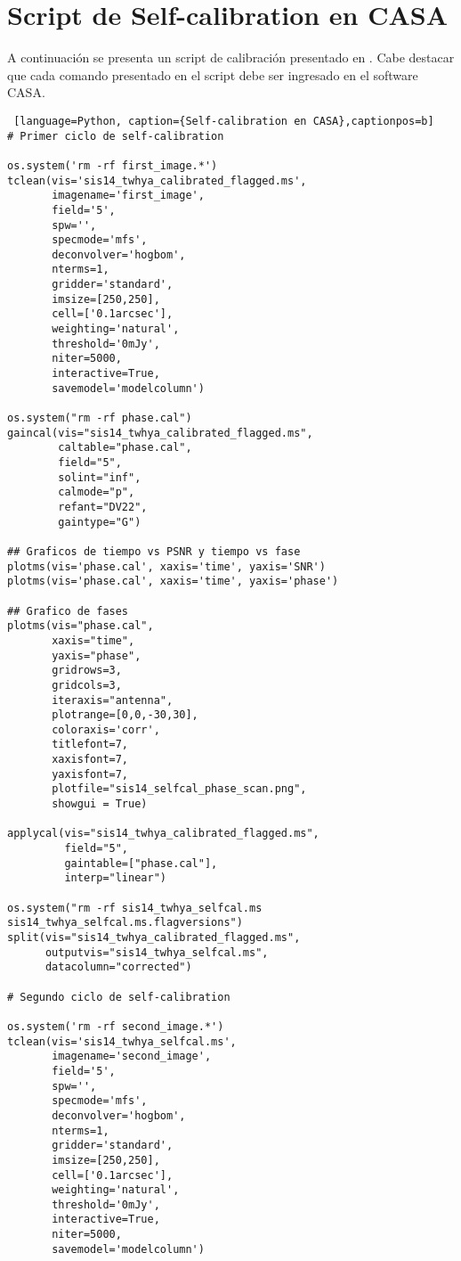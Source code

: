\chapter{Script de Self-calibration en CASA}
\label{finales:anexo2}

A continuación se presenta un script de calibración presentado en \cite{CASA_self_cal}. Cabe destacar que cada comando presentado en el script debe ser ingresado en el software CASA. 

\begin{lstlisting} [language=Python, caption={Self-calibration en CASA},captionpos=b]
# Primer ciclo de self-calibration

os.system('rm -rf first_image.*')
tclean(vis='sis14_twhya_calibrated_flagged.ms',
       imagename='first_image',
       field='5',
       spw='',
       specmode='mfs',
       deconvolver='hogbom',
       nterms=1,
       gridder='standard',
       imsize=[250,250],
       cell=['0.1arcsec'],
       weighting='natural',
       threshold='0mJy',
       niter=5000,
       interactive=True,
       savemodel='modelcolumn')

os.system("rm -rf phase.cal")
gaincal(vis="sis14_twhya_calibrated_flagged.ms",
        caltable="phase.cal",
        field="5",
        solint="inf",
        calmode="p",
        refant="DV22",
        gaintype="G")

## Graficos de tiempo vs PSNR y tiempo vs fase
plotms(vis='phase.cal', xaxis='time', yaxis='SNR')
plotms(vis='phase.cal', xaxis='time', yaxis='phase')

## Grafico de fases
plotms(vis="phase.cal", 
       xaxis="time", 
       yaxis="phase", 
       gridrows=3, 
       gridcols=3, 
       iteraxis="antenna", 
       plotrange=[0,0,-30,30], 
       coloraxis='corr',
       titlefont=7, 
       xaxisfont=7, 
       yaxisfont=7, 
       plotfile="sis14_selfcal_phase_scan.png", 
       showgui = True)

applycal(vis="sis14_twhya_calibrated_flagged.ms",
         field="5",
         gaintable=["phase.cal"],
         interp="linear")

os.system("rm -rf sis14_twhya_selfcal.ms sis14_twhya_selfcal.ms.flagversions")
split(vis="sis14_twhya_calibrated_flagged.ms",
      outputvis="sis14_twhya_selfcal.ms",
      datacolumn="corrected")

# Segundo ciclo de self-calibration

os.system('rm -rf second_image.*')
tclean(vis='sis14_twhya_selfcal.ms',
       imagename='second_image',
       field='5',
       spw='',
       specmode='mfs',
       deconvolver='hogbom',
       nterms=1,
       gridder='standard',
       imsize=[250,250],
       cell=['0.1arcsec'],
       weighting='natural',
       threshold='0mJy',
       interactive=True,
       niter=5000,
       savemodel='modelcolumn')


\end{lstlisting}
